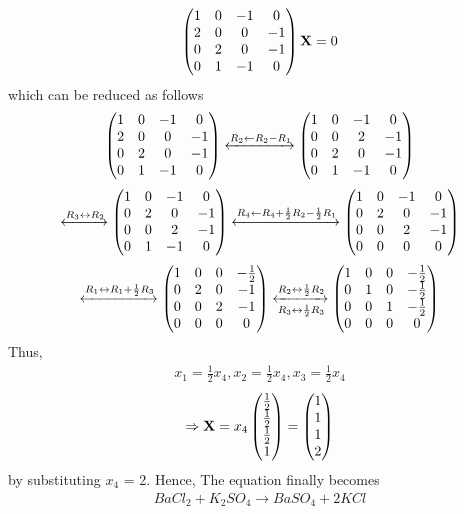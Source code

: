 \documentclass{beamer}
\numberwithin{equation}{section}
\begin{document}
		\begin{align}
				\begin{pmatrix}1 & 0 &-1&0\\2&0&0&-1\\0&2&0&-1\\0&1&-1&0\end{pmatrix}\mathbf{X} = 0
		\end{align}
		which can be reduced as follows
		\begin{align}
				\begin{pmatrix}
						1&0&-1&0\\
						2&0&0&-1\\
						0&2&0&-1\\
						0&1&-1&0
				\end{pmatrix}\xleftrightarrow[]{R_2\leftarrow R_2-R_1} 
				\begin{pmatrix}
						1&0&-1&0\\
						0&0&2&-1\\
						0&2&0&-1\\
						0&1&-1&0\end{pmatrix}
		\end{align}
		\begin{align}
				\xleftrightarrow[]{R_3\leftrightarrow R_2} 
				\begin{pmatrix}
						1&0&-1&0\\
						0&2&0&-1\\
						0&0&2&-1\\
						0&1&-1&0
				\end{pmatrix}\xleftrightarrow[]{R_4\leftarrow R_4+\frac{1}{2}R_2-\frac{1}{2}R_1} 
				\begin{pmatrix}
						1&0&-1&0\\
						0&2&0&-1\\
						0&0&2&-1\\
						0&0&0&0\end{pmatrix}
		\end{align}
		\begin{align}
				\xleftrightarrow[]{R_1\leftrightarrow R_1+\frac{1}{2}R_3} 
				\begin{pmatrix}
						1&0&0&-\frac{1}{2}\\
						0&2&0&-1\\
						0&0&2&-1\\
						0&0&0&0\end{pmatrix}
				\xleftrightarrow[R_3\leftrightarrow \frac{1}{2}R_3]{R_2\leftrightarrow \frac{1}{2}R_2} 
				\begin{pmatrix}
						1&0&0&-\frac{1}{2}\\
						0&1&0&-\frac{1}{2}\\
						0&0&1&-\frac{1}{2}\\
						0&0&0&0\end{pmatrix}
		\end{align}
		Thus,
		\begin{align}
				x_1 = \frac{1}{2}x_4,x_2 = \frac{1}{2}x_4,x_3 = \frac{1}{2}x_4
		\end{align}
		\begin{align}
				\Rightarrow \mathbf{X} = x_4\begin{pmatrix}\frac{1}{2}\\\frac{1}{2}\\\frac{1}{2}\\1\end{pmatrix} = \begin{pmatrix}1\\1\\1\\2\end{pmatrix}
		\end{align}
		by substituting $x_4$ = 2. Hence, The equation finally becomes
		\begin{align}
				BaCl_2+K_2SO_4 \rightarrow BaSO_4+2KCl
		\end{align}

				
\end{document}
